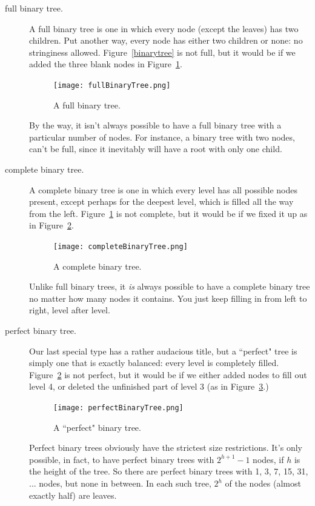 \begin{description}
\item [full binary tree.] A full binary tree is one in which every node
(except the leaves) has two children. Put another way, every node has
either two children or none: no stringiness allowed.
Figure~\ref{binarytree} is not full, but it would be if we added the three
blank nodes in Figure~\ref{fullbinarytree}.

\begin{figure}[ht]
\centering
\texttt{[image: fullBinaryTree.png]}
\caption{A full binary tree.}
\label{fullbinarytree}
\end{figure}

By the way, it isn't always possible to have a full binary tree with a
particular number of nodes. For instance, a binary tree with two nodes,
can't be full, since it inevitably will have a root with only one child.

\item [complete binary tree.] A complete binary tree is one in which every
level has all possible nodes present, except perhaps for the deepest level,
which is filled all the way from the left. Figure~\ref{fullbinarytree} is
not complete, but it would be if we fixed it up as in
Figure~\ref{completebinarytree}.

\begin{figure}[ht]
\centering
\texttt{[image: completeBinaryTree.png]}
\caption{A complete binary tree.}
\label{completebinarytree}
\end{figure}

Unlike full binary trees, it \textit{is} always possible to have a complete
binary tree no matter how many nodes it contains. You just keep filling in
from left to right, level after level.

\item [perfect binary tree.] Our last special type has a rather audacious
title, but a ``perfect" tree is simply one that is exactly balanced: every
level is completely filled. 
Figure~\ref{completebinarytree} is
not perfect, but it would be if we either added nodes to fill out level 4,
or deleted the unfinished part of level 3 (as in
Figure~\ref{perfectbinarytree}.)

\begin{figure}[ht]
\centering
\texttt{[image: perfectBinaryTree.png]}
\caption{A ``perfect" binary tree.}
\label{perfectbinarytree}
\end{figure}

Perfect binary trees obviously have the strictest size restrictions. It's
only possible, in fact, to have perfect binary trees with $2^{h+1}-1$
nodes, if $h$ is the height of the tree. So there are perfect binary trees
with 1, 3, 7, 15, 31, ... nodes, but none in between. In each such tree,
$2^h$ of the nodes (almost exactly half) are leaves.

\end{description}


